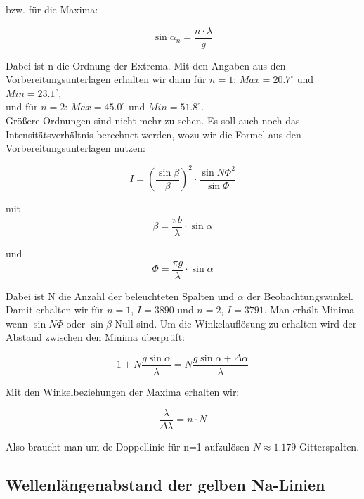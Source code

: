 \documentclass[a4paper,titlepage]{scrartcl}
\numberwithin{equation}{section}
\begin{document}
bzw. für die Maxima:
 
\begin{equation}
\sin{\alpha_n}= \frac{n \cdot \lambda}{g}
\end{equation}
 
Dabei ist n die Ordnung der Extrema. Mit den Angaben aus den Vorbereitungsunterlagen erhalten wir dann für $n=1$: $Max = 20.7^\circ$ und $Min = 23.1 ^\circ$,\\
und für $n=2$:  $Max = 45.0^{\circ}$ und $Min = 51.8 ^{\circ}$.\\
 
Größere Ordnungen sind nicht mehr zu sehen.
Es soll auch noch das Intensitätsverhältnis berechnet werden, wozu wir die Formel aus den Vorbereitungsunterlagen nutzen:
 
\begin{equation}
I = \left(\frac{\sin{\beta}}{\beta}\right)^2 \cdot \frac{\sin{N \Phi }^2}{\sin{\Phi}}
\end{equation}
 
mit 
\begin{equation}
 \beta = \frac{\pi b}{\lambda} \cdot \sin{\alpha}
\end{equation}
 
und
\begin{equation}
 \Phi = \frac{\pi g}{\lambda} \cdot \sin{\alpha}
\end{equation}
 
Dabei ist N die Anzahl der beleuchteten Spalten und $\alpha$ der Beobachtungswinkel. Damit erhalten wir für $n=1$, $I=3890$ und $n=2$, $I=3791$.
Man erhält Minima wenn $\sin{N \Phi}$ oder $ \sin{\beta}$ Null sind.
Um die Winkelauflösung zu erhalten wird der Abstand zwischen den Minima überprüft:
 
\begin{equation}
1+ N \frac{g \sin{\alpha}}{\lambda} = N \frac{g \sin{\alpha +  \Delta \alpha}}{\lambda}
\end{equation}
 
Mit den Winkelbeziehungen der Maxima erhalten wir:
 
\begin{equation}
\frac{\lambda}{\Delta \lambda} = n \cdot N
\end{equation}
 
Also braucht man um de Doppellinie für n=1 aufzulösen $N \approx 1.179$ Gitterspalten.
 
\subsection{Wellenlängenabstand der gelben Na-Linien}
 
\end{document}
